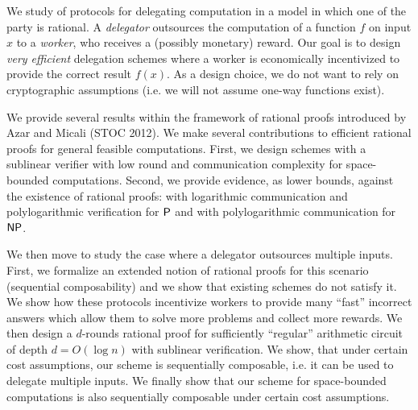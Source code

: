 % 
% 
%



	\noindent
	We  study of protocols for delegating computation in a model in which one of the party is rational.
	A \textit{delegator} outsources the computation of a function $f$ on input $x$ to a \textit{worker}, who
	receives a (possibly monetary) reward. Our goal is to design \textit{very efficient} delegation schemes 
	where a worker is economically incentivized to provide the correct result
	$f(x)$. As a design choice, we do not want to rely on cryptographic assumptions
	(i.e. we will not assume one-way functions exist).
	
	We provide several results within the framework of rational proofs introduced by Azar and Micali (STOC 2012).
	We make several contributions to efficient rational proofs for general feasible computations.
	First, we design schemes with a sublinear verifier with low round and communication complexity for
	space-bounded computations.
	Second, we provide evidence, as lower bounds, against the existence of rational proofs:
	with logarithmic communication and polylogarithmic verification for $\P$ and 
	with polylogarithmic communication for $\NP$.
	
	We then move to study the case where a delegator outsources multiple inputs.
	First, we formalize an extended notion of rational proofs for this scenario (sequential composability) and we
	show that existing schemes do not satisfy it. We show how these protocols incentivize workers
	to provide many ``fast'' incorrect answers which allow them to solve more problems and collect more rewards.
	We then design a $d$-rounds rational proof for sufficiently ``regular'' arithmetic circuit of depth $d = O(\log{n})$
	with sublinear verification. We show, that under certain cost assumptions, our scheme is sequentially composable,
	i.e. it can be used to delegate multiple inputs. We finally show that our scheme for space-bounded computations is also 
	sequentially composable under certain cost assumptions.
	
